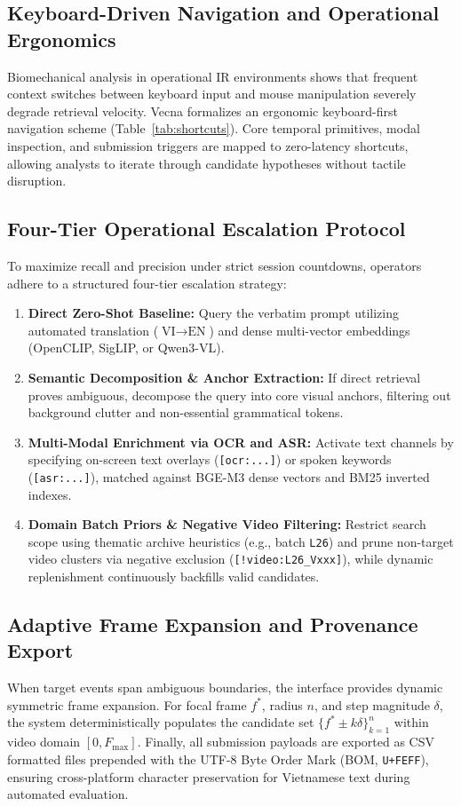 \subsection{Keyboard-Driven Navigation and Operational Ergonomics}
Biomechanical analysis in operational IR environments shows that frequent context switches between keyboard input and mouse manipulation severely degrade retrieval velocity. Vecna formalizes an ergonomic keyboard-first navigation scheme (Table~\ref{tab:shortcuts}). Core temporal primitives, modal inspection, and submission triggers are mapped to zero-latency shortcuts, allowing analysts to iterate through candidate hypotheses without tactile disruption.

\subsection{Four-Tier Operational Escalation Protocol}
To maximize recall and precision under strict session countdowns, operators adhere to a structured four-tier escalation strategy:
\begin{enumerate}[label=\textbf{Tier \arabic*:}, leftmargin=*]
    \item \textbf{Direct Zero-Shot Baseline:} Query the verbatim prompt utilizing automated translation ($\text{VI} \rightarrow \text{EN}$) and dense multi-vector embeddings (OpenCLIP, SigLIP, or Qwen3-VL).
    \item \textbf{Semantic Decomposition \& Anchor Extraction:} If direct retrieval proves ambiguous, decompose the query into core visual anchors, filtering out background clutter and non-essential grammatical tokens.
    \item \textbf{Multi-Modal Enrichment via OCR and ASR:} Activate text channels by specifying on-screen text overlays (\texttt{[ocr:...]}) or spoken keywords (\texttt{[asr:...]}), matched against BGE-M3 dense vectors and BM25 inverted indexes.
    \item \textbf{Domain Batch Priors \& Negative Video Filtering:} Restrict search scope using thematic archive heuristics (e.g., batch \texttt{L26}) and prune non-target video clusters via negative exclusion (\texttt{[!video:L26\_Vxxx]}), while dynamic replenishment continuously backfills valid candidates.
\end{enumerate}

\subsection{Adaptive Frame Expansion and Provenance Export}
When target events span ambiguous boundaries, the interface provides dynamic symmetric frame expansion. For focal frame $f^*$, radius $n$, and step magnitude $\delta$, the system deterministically populates the candidate set $\{f^* \pm k\delta\}_{k=1}^n$ within video domain $[0, F_{\max}]$. Finally, all submission payloads are exported as CSV formatted files prepended with the UTF-8 Byte Order Mark (BOM, \texttt{U+FEFF}), ensuring cross-platform character preservation for Vietnamese text during automated evaluation.
